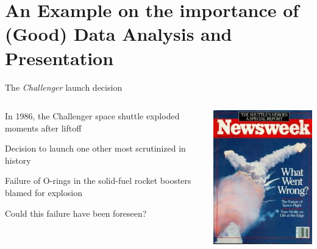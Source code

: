 \documentclass[11pt]{beamer}
\begin{document}

\section{An Example on the importance of (Good) Data Analysis and Presentation}


\begin{frame}{The \textit{Challenger} launch decision}
\begin{columns}
\begin{column}{0.5\textwidth}
In 1986, the Challenger space shuttle exploded moments after liftoff

Decision to launch one other most scrutinized in history

Failure of O-rings in the solid-fuel rocket boosters blamed for explosion

Could this failure have been foreseen? 
\end{column}
\begin{column}{0.5\textwidth}
\begin{center}
\includegraphics[scale=.5]{shuttle.jpg}
\end{center}
\end{column}
\end{columns}
\end{frame}
\end{document}
